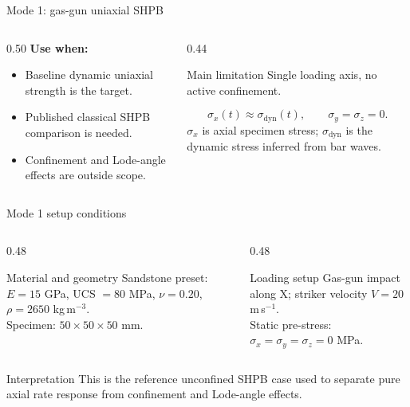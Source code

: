 \documentclass[11pt,aspectratio=169]{beamer}
\newcommand{\cncue}[1]{{\footnotesize\color{TUSTmidgray} #1}}
\begin{document}
\begin{frame}{Mode 1: gas-gun uniaxial SHPB}
  \begin{columns}[T,onlytextwidth]
    \begin{column}{0.50\textwidth}
      \textbf{Use when:}
      \begin{itemize}
        \item Baseline dynamic uniaxial strength is the target.
        \item Published classical SHPB comparison is needed.
        \item Confinement and Lode-angle effects are outside scope.
      \end{itemize}
    \end{column}
    \begin{column}{0.44\textwidth}
      \begin{block}{Main limitation}
        Single loading axis, no active confinement.
      \end{block}
      \[
        \sigma_x(t)\approx\sigma_{\mathrm{dyn}}(t), \qquad
        \sigma_y=\sigma_z=0 .
      \]
      \cncue{$\sigma_x$ is axial specimen stress; $\sigma_{\mathrm{dyn}}$ is the dynamic stress inferred from bar waves.}
    \end{column}
  \end{columns}
\end{frame}

\begin{frame}{Mode 1 setup conditions}
  \small
  \begin{columns}[T,onlytextwidth]
    \begin{column}{0.48\textwidth}
      \begin{block}{Material and geometry}
        Sandstone preset: $E=15$ GPa, UCS $=80$ MPa, $\nu=0.20$,
        $\rho=2650$ kg\,m$^{-3}$.\\[3pt]
        Specimen: $50\times50\times50$ mm.
      \end{block}
    \end{column}
    \begin{column}{0.48\textwidth}
      \begin{exampleblock}{Loading setup}
        Gas-gun impact along X; striker velocity $V=20$ m\,s$^{-1}$.\\[3pt]
        Static pre-stress: $\sigma_x=\sigma_y=\sigma_z=0$ MPa.
      \end{exampleblock}
    \end{column}
  \end{columns}
  \vspace{0.2cm}
  \begin{block}{Interpretation}
    This is the reference unconfined SHPB case used to separate pure axial
    rate response from confinement and Lode-angle effects.
  \end{block}
\end{frame}
\end{document}
